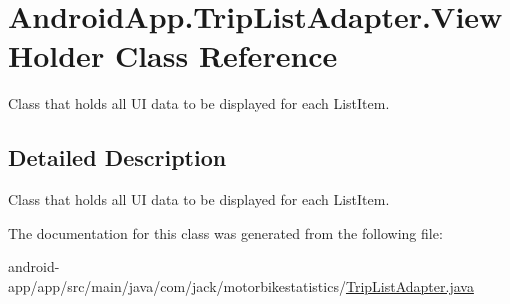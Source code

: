 \hypertarget{class_android_app_1_1_trip_list_adapter_1_1_view_holder}{}\section{Android\+App.\+Trip\+List\+Adapter.\+View\+Holder Class Reference}
\label{class_android_app_1_1_trip_list_adapter_1_1_view_holder}


Class that holds all UI data to be displayed for each List\+Item.  




\subsection{Detailed Description}
Class that holds all UI data to be displayed for each List\+Item. 

The documentation for this class was generated from the following file\+:\begin{DoxyCompactItemize}
\item 
android-\/app/app/src/main/java/com/jack/motorbikestatistics/\hyperlink{_trip_list_adapter_8java}{Trip\+List\+Adapter.\+java}\end{DoxyCompactItemize}
